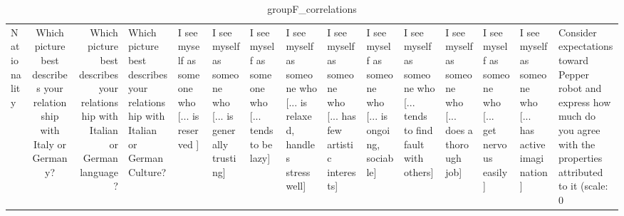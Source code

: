 \begin{table}
\caption{groupF_correlations}
\label{tab:groupF_correlations}
\begin{tabular}{lcr}
\toprule
Nationality & Which picture best describes your relationship with Italy or Germany? & Which picture best describes your relationship with Italian or German language? & Which picture best describes your relationship with Italian or German Culture? & I see myself as someone who  [... is reserved ] & I see myself as someone who  [... is generally trusting] & I see myself as someone who  [... tends to be lazy] & I see myself as someone who  [... is relaxed, handles stress well] & I see myself as someone who  [... has few artistic interests] & I see myself as someone who  [... is ongoing, sociable] & I see myself as someone who  [... tends to find fault with others] & I see myself as someone who  [... does a thorough job] & I see myself as someone who  [... get nervous easily] & I see myself as someone who  [... has active imagination] & Consider expectations toward Pepper robot and express how much do you agree with the properties attributed to it (scale: 0%
\end{tabular}
\end{table}
